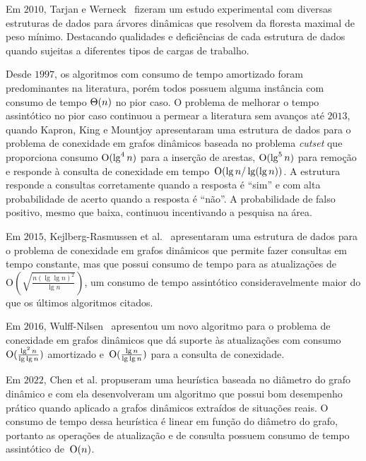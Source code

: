 Em $2010$, Tarjan e Werneck~\cite{tarjanWerneck2010} fizeram um estudo experimental com diversas estruturas de dados para árvores dinâmicas que resolvem  da floresta maximal de peso mínimo.
Destacando qualidades e deficiências de cada estrutura de dados quando sujeitas a diferentes tipos de cargas de trabalho. 

Desde $1997$, os algoritmos com consumo de tempo amortizado foram predominantes na literatura, porém todos possuem alguma instância com consumo de tempo $\Theta(n)$ no pior caso.
O problema de melhorar o tempo assintótico no pior caso continuou a permear a literatura sem avanços até $2013$, quando Kapron, King e Mountjoy \cite{bruceM} apresentaram uma estrutura de dados para o problema de conexidade em grafos dinâmicos baseada no problema \textit{cutset} que proporciona consumo $\mathrm{O}(\lg^4 n)$ para a inserção de arestas, $\mathrm{O}(\lg^5 n)$ para remoção e responde à consulta de conexidade em tempo~$\mathrm{O}(\lg n / \lg(\lg n))$.
A estrutura responde a consultas corretamente quando a resposta é “sim” e com alta probabilidade de acerto quando a resposta é “não”. A probabilidade de falso positivo, mesmo que baixa, continuou incentivando a pesquisa na área. 

Em $2015$, Kejlberg-Rasmussen et al.~\cite{kejlbergrasmussen_et_al} apresentaram uma estrutura de dados para o problema de conexidade em grafos dinâmicos que permite fazer consultas em tempo constante, mas que possui consumo de tempo para as atualizações de~$\mathrm{O}\!\left(\sqrt{\frac{n\left(\lg \lg n\right)^2}{\lg n}}\right)$, um consumo de tempo assintótico consideravelmente maior do que os últimos algoritmos citados.

Em $2016$, Wulff-Nilsen~\cite{Wulff-Nilsen2016} apresentou um novo algoritmo para o problema de conexidade em grafos dinâmicos que dá suporte às atualizações com consumo~$\mathrm{O}(\frac{\lg^2 n}{\lg \lg n})$ amortizado e~$\mathrm{O}(\frac{\lg n}{\lg \lg n})$ para a consulta de conexidade.

Em $2022$, Chen et al. \cite{QC22} propuseram uma heurística baseada no diâmetro do grafo dinâmico e com ela desenvolveram um algoritmo que possui bom desempenho prático quando aplicado a grafos dinâmicos extraídos de situações reais.
O consumo de tempo dessa heurística é linear em função do diâmetro do grafo, portanto as operações de atualização e de consulta possuem consumo de tempo assintótico de~$\mathrm{O}(n)$.

